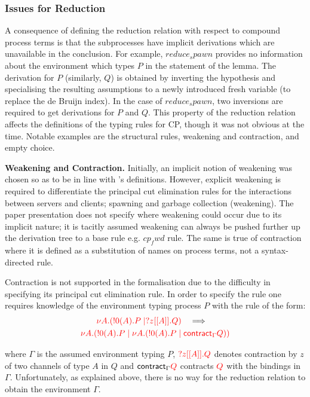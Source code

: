 \subsubsection{Issues for Reduction}

A consequence of defining the reduction relation with respect to compound
process terms is that the subprocesses have implicit derivations which are
unavailable in the conclusion. For example, \coqe$reduce_spawn$ provides no
information about the environment which types \coqe$P$ in the statement of the
lemma. The derivation for \coqe$P$ (similarly, \coqe$Q$) is obtained by
inverting the hypothesis  and specialising the resulting assumptions
to a newly introduced fresh variable (to replace the de Bruijn index). In the
case of \coqe$reduce_spawn$, two inversions are required to get derivations
for \coqe$P$ and \coqe$Q$. This property of the reduction relation affects the
definitions of the typing rules for CP, though it was not obvious at the time.
Notable examples are the structural rules, weakening and contraction, and
empty choice.

\textbf{Weakening and Contraction.} Initially, an implicit notion of weakening
was chosen so as to be in line with \citeauthor{Wadler:2014}'s
definitions. However, explicit weakening is required to differentiate the
principal cut elimination rules for the interactions between servers and
clients; spawning and garbage collection (weakening). The paper presentation
does not specify where weakening could occur due to its implicit nature; it is
tacitly assumed weakening can always be pushed further up the derivation tree
to a base rule e.g. \coqe$cp_fwd$ rule. The same is true of contraction where
it is defined as a substitution of names on process terms, not a
syntax-directed rule.

\begin{samepage}
Contraction is not supported in the formalisation due to the difficulty in
specifying its principal cut elimination rule.  In order to specify the rule
one requires knowledge of the environment typing process \coqe$P$ with the
rule of the form:
\begin{gather*}
{\color{red}\nu A.(!0(A).P \mid ?z[[A]].Q)}
\quad \Longrightarrow \quad \\
{\color{red} \nu A.(!0(A).P \mid \nu A.(!0(A).P \mid \textsf{contract}_{\Gamma} Q))}
\end{gather*}

where $\Gamma$ is the assumed environment typing \coqe$P$, ${\color{red} ?z[[A]].Q}$
denotes contraction by $z$ of two channels of type $A$ in $Q$ and
$\textsf{contract}_{\Gamma} {\color{red} Q}$ contracts ${\color{red} Q}$ with the bindings in
$\Gamma$. Unfortunately, as explained above, there is no way for the reduction
relation to obtain the environment $\Gamma$.
\end{samepage}

